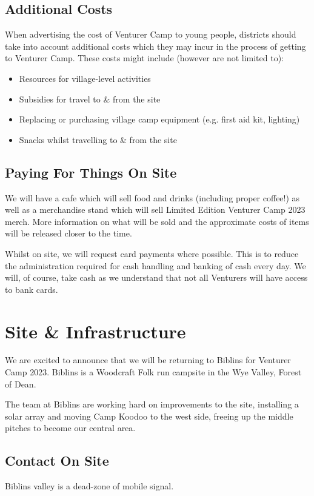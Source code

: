 \documentclass[a4paper, 10pt]{report}
\begin{document}
\section{Additional Costs}
When advertising the cost of Venturer Camp to young people, districts should take into account additional costs which they may incur in the process of getting to Venturer Camp. These costs might include (however are not limited to):
\begin{itemize}
    \item Resources for village-level activities
    \item Subsidies for travel to \& from the site
    \item Replacing or purchasing village camp equipment (e.g. first aid kit, lighting)
    \item Snacks whilst travelling to \& from the site
\end{itemize}
\section{Paying For Things On Site}
We will have a cafe which will sell food and drinks (including proper coffee!) as well as a merchandise stand which will sell Limited Edition Venturer Camp 2023 merch. More information on what will be sold and the approximate costs of items will be released closer to the time. 

Whilst on site, we will request card payments where possible. This is to reduce the administration required for cash handling and banking of cash every day. We will, of course, take cash as we understand that not all Venturers will have access to bank cards.

\chapter{Site \& Infrastructure}
We are excited to announce that we will be returning to Biblins for Venturer Camp 2023. Biblins is a Woodcraft Folk run campsite in the Wye Valley, Forest of Dean. 

The team at Biblins are working hard on improvements to the site, installing a solar array and moving Camp Koodoo to the west side, freeing up the middle pitches to become our central area. 
\section{Contact On Site}
Biblins valley is a dead-zone of mobile signal.
\end{document}

